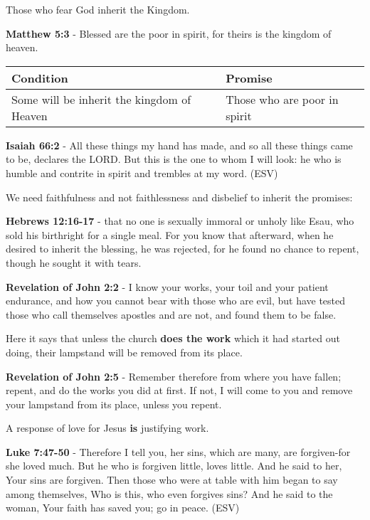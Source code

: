 \documentclass[11pt]{article}
\begin{document}
Those who fear God inherit the Kingdom.

\textbf{Matthew 5:3} - Blessed are the poor in spirit, for theirs is the kingdom of heaven.

\begin{center}
\begin{tabular}{ll}
Condition & Promise\\[0pt]
\hline
Some will be inherit the kingdom of Heaven & Those who are poor in spirit\\[0pt]
\end{tabular}
\end{center}

\textbf{Isaiah 66:2} -  All these things my hand has made, and so all these things came to be, declares the LORD.  But this is the one to whom I will look: he who is humble and contrite in spirit and trembles at my word.  (ESV)

We need faithfulness and not faithlessness and disbelief to inherit the promises:

\textbf{Hebrews 12:16-17} - that no one is sexually immoral or unholy like Esau, who sold his birthright for a single meal. For you know that afterward, when he desired to inherit the blessing, he was rejected, for he found no chance to repent, though he sought it with tears.

\textbf{Revelation of John 2:2} - I know your works, your toil and your patient endurance, and how you cannot bear with those who are evil, but have tested those who call themselves apostles and are not, and found them to be false.

Here it says that unless the church \textbf{does the work} which it had started out doing, their lampstand will be removed from its place.

\textbf{Revelation of John 2:5} - Remember therefore from where you have fallen; repent, and do the works you did at first. If not, I will come to you and remove your lampstand from its place, unless you repent.

A response of love for Jesus \textbf{is} justifying work.

\textbf{Luke 7:47-50} -  Therefore I tell you, her sins, which are many, are forgiven-for she loved much.  But he who is forgiven little, loves little.  And he said to her, Your sins are forgiven.  Then those who were at table with him began to say among themselves, Who is this, who even forgives sins?  And he said to the woman, Your faith has saved you; go in peace.  (ESV)
\end{document}
